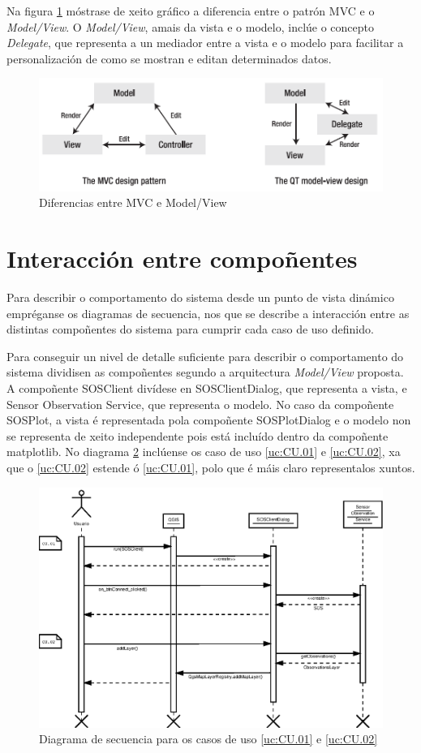 Na figura \ref{fig:MVCvsMV} móstrase de xeito gráfico a diferencia entre o patrón MVC e o \emph{Model/View}. O \emph{Model/View}, amais da vista e o modelo, inclúe o concepto \emph{Delegate}, que representa a un mediador entre a vista e o modelo para facilitar a personalización de como se mostran e editan determinados datos.

\begin{figure}[hbtp]
 \centering
 \includegraphics[width=\textwidth]{images/MVCvsMV.png}
 \caption{Diferencias entre MVC e Model/View}
 \label{fig:MVCvsMV}
\end{figure}

\section{Interacción entre compoñentes}
Para describir o comportamento do sistema desde un punto de vista dinámico empréganse os diagramas de secuencia, nos que se describe a interacción entre as distintas compoñentes do sistema para cumprir cada caso de uso definido.

Para conseguir un nivel de detalle suficiente para describir o comportamento do sistema dividisen as compoñentes segundo a arquitectura \emph{Model/View} proposta. A compoñente SOSClient divídese en SOSClientDialog, que representa a vista, e Sensor Observation Service, que representa o modelo. No caso da compoñente SOSPlot, a vista é representada pola compoñente SOSPlotDialog e o modelo non se representa de xeito independente pois está incluído dentro da compoñente matplotlib.
\newpage
No diagrama \ref{fig:diaSeq1-2} inclúense os caso de uso \ref{uc:CU.01} e \ref{uc:CU.02}, xa que o \ref{uc:CU.02} estende ó \ref{uc:CU.01}, polo que é máis claro representalos xuntos.
\begin{figure}[H]
 \centering
 \includegraphics[width=.9\textwidth]{images/seq1-2.eps}
 \caption{Diagrama de secuencia para os casos de uso \ref{uc:CU.01} e \ref{uc:CU.02}}
 \label{fig:diaSeq1-2}
\end{figure}

